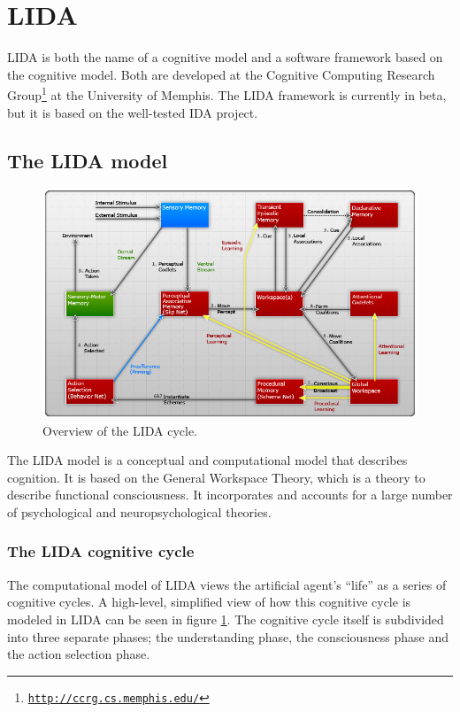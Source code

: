 
\section{LIDA}
\label{sec:lida}
LIDA is both the name of a cognitive model and a software framework based on the cognitive model. Both are developed at the Cognitive Computing Research Group\footnote{\href{http://ccrg.cs.memphis.edu/}{\tt http://ccrg.cs.memphis.edu/}} at the University of Memphis. The LIDA framework is currently in beta, but it is based on the well-tested IDA project.

\subsection{The LIDA model}
\begin{figure}[h!tb]
\centering
\includegraphics[width=\textwidth]{graphics/lida-model.png}
\caption{Overview of the LIDA cycle.\cite{franklin2007lida}}
\label{fig:lida-cycle}
\end{figure}

The LIDA model is a conceptual and computational model that describes cognition. It is based on the General Workspace Theory, which is a theory to describe functional consciousness. It incorporates and accounts for a large number of psychological and neuropsychological theories.\cite{Franklin2012}

\subsubsection{The LIDA cognitive cycle}
The computational model of LIDA views the artificial agent's ``life'' as a series of cognitive cycles. A high-level, simplified view of how this cognitive cycle is modeled in LIDA can be seen in figure \ref{fig:lida-cycle}. The cognitive cycle itself is subdivided into three separate phases; the understanding phase, the consciousness phase and the action selection phase.


